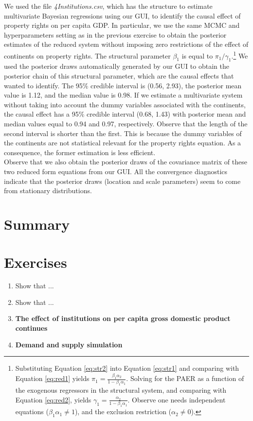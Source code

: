 We used the file \textit{4Institutions.csv}, which has the structure to estimate multivariate Bayesian regressions using our GUI, to identify the causal effect of property rights on per capita GDP.
In particular, we use the same MCMC and hyperparameters setting as in the previous exercise to obtain the posterior estimates of the reduced system without imposing zero restrictions of the effect of continents on property rights.
The structural parameter $\beta_1$ is equal to $\pi_1/\gamma_1$.\footnote{Substituting Equation \ref{eq:str2} into Equation \ref{eq:str1} and comparing with Equation \ref{eq:red1} yields $\pi_1=\frac{\beta_1\alpha_2}{1-\beta_1\alpha_1}$.
	Solving for the PAER as a function of the exogenous regressors in the structural system, and comparing with Equation \ref{eq:red2}, yields $\gamma_1=\frac{\alpha_2}{1-\beta_1\alpha_1}$.
	Observe one needs independent equations ($\beta_1\alpha_1\neq 1$), and the exclusion restriction ($\alpha_2\neq 0$).} We used the posterior draws automatically generated by our GUI to obtain the posterior chain of this structural parameter, which are the causal effects  that \cite{Acemoglu2001} wanted to identify.
The 95\% credible interval is (0.56, 2.93), the posterior mean value is 1.12, and the median value is 0.98.
If we estimate a multivariate system without taking into account the dummy variables associated with the continents, the causal effect has a 95\% credible interval (0.68, 1.43) with posterior mean and median values equal to 0.94 and 0.97, respectively.
Observe that the length of the second interval is shorter than the first.
This is because the dummy variables of the continents are not statistical relevant for the property rights equation. As a consequence, the former estimation is less efficient.\\

Observe that we also obtain the posterior draws of the covariance matrix of these two reduced form equations from our GUI.
All the convergence diagnostics indicate that the posterior draws (location and scale parameters) seem to come from stationary distributions.\\

\section{Summary}\label{sec75}

\section{Exercises}\label{sec76}
\begin{enumerate}
	\item Show that ...
	
	\item Show that ...
	
	\item \textbf{The effect of institutions on per capita gross domestic product continues}
	
	\item \textbf{Demand and supply simulation}
	
	
\end{enumerate}


